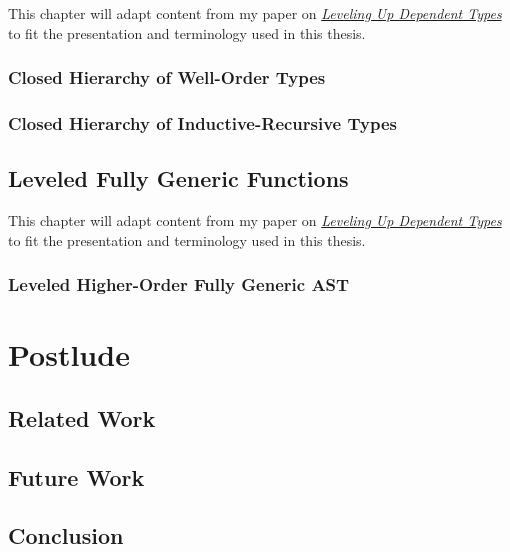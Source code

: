\documentclass[12pt]{report}
\theoremstyle{definition}
\theoremstyle{remark}
\numberwithin{definition}{section}
\numberwithin{equation}{section}
\numberwithin{proposition}{section}
\numberwithin{conjecture}{section}
\numberwithin{theorem}{section}
\numberwithin{lemma}{section}
\numberwithin{corollary}{section}
\numberwithin{example}{section}
\numberwithin{remark}{section}
\begin{document}
This chapter will adapt content from my paper on
\href{http://dl.acm.org/citation.cfm?id=2502414}
     {\textit{Leveling Up Dependent Types}}
to fit the presentation and terminology used in this thesis.

\section{Closed Hierarchy of Well-Order Types}\label{sec:hierw}
\section{Closed Hierarchy of Inductive-Recursive Types}\label{sec:hierir}


\chapter{Leveled Fully Generic Functions}\label{ch:fulliesg}

This chapter will adapt content from my paper on
\href{http://dl.acm.org/citation.cfm?id=2502414}
     {\textit{Leveling Up Dependent Types}}~\cite{diehl:levelingup}
to fit the presentation and terminology used in this thesis.

\section{Leveled Higher-Order Fully Generic AST}\label{ch:gasts}

\part{Postlude}\label{part:postlude}

\chapter{Related Work}\label{ch:related}
\chapter{Future Work}\label{ch:future}
\chapter{Conclusion}\label{ch:conclusion}
\end{document}
